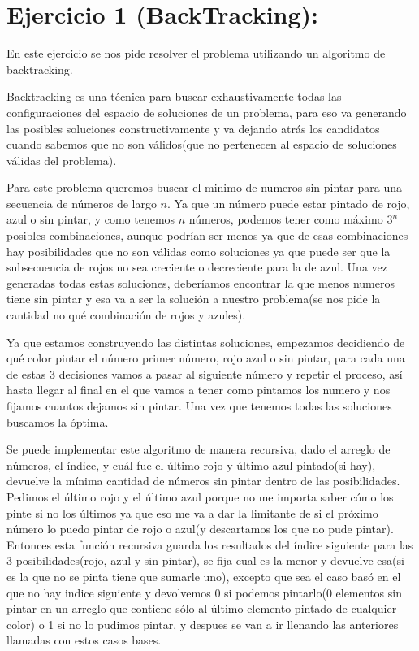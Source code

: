 \section{Ejercicio 1 (BackTracking):}

En este ejercicio se nos pide resolver el problema utilizando un algoritmo de backtracking.

Backtracking es una técnica para buscar exhaustivamente todas las configuraciones del espacio de soluciones de un problema, para eso va generando las posibles soluciones constructivamente y va dejando atrás los candidatos cuando sabemos que no son válidos(que no pertenecen al espacio de soluciones válidas del problema).

Para este problema queremos buscar el minimo de numeros sin pintar para una secuencia de números de largo $n$. Ya que un número puede estar pintado de rojo, azul o sin pintar, y como tenemos $n$ números, podemos tener como máximo $3^n$ posibles combinaciones, aunque podrían ser menos ya que de esas combinaciones hay posibilidades que no son válidas como soluciones ya que puede ser que la subsecuencia de rojos no sea creciente o decreciente para la de azul. Una vez generadas todas estas soluciones, deberíamos encontrar la que menos numeros tiene sin pintar y esa va a ser la solución a nuestro problema(se nos pide la cantidad no qué combinación de rojos y azules).

Ya que estamos construyendo las distintas soluciones, empezamos decidiendo de qué color pintar el número primer número, rojo azul o sin pintar, para cada una de estas 3 decisiones vamos a pasar al siguiente número y repetir el proceso, así hasta llegar al final en el que vamos a tener como pintamos los numero y nos fijamos cuantos dejamos sin pintar. Una vez que tenemos todas las soluciones buscamos la óptima.

Se puede implementar este algoritmo de manera recursiva, dado el arreglo de números, el índice, y cuál fue el último rojo y último azul pintado(si hay), devuelve la mínima cantidad de números sin pintar dentro de las posibilidades. Pedimos el último rojo y el último azul porque no me importa saber cómo los pinte si no los últimos ya que eso me va a dar la limitante de si el próximo número lo puedo pintar de rojo o azul(y descartamos los que no pude pintar). Entonces esta función recursiva guarda los resultados del índice siguiente para las 3 posibilidades(rojo, azul y sin pintar), se fija cual es la menor y devuelve esa(si es la que no se pinta tiene que sumarle uno), excepto que sea el caso basó en el que no hay indice siguiente y devolvemos 0 si podemos pintarlo(0 elementos sin pintar en un arreglo que contiene sólo al último elemento pintado de cualquier color) o 1 si no lo pudimos pintar, y despues se van a ir llenando las anteriores llamadas con estos casos bases.

